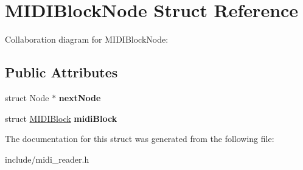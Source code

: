 \hypertarget{structMIDIBlockNode}{\section{M\-I\-D\-I\-Block\-Node Struct Reference}
\label{structMIDIBlockNode}
}


Collaboration diagram for M\-I\-D\-I\-Block\-Node\-:
\subsection*{Public Attributes}
\begin{DoxyCompactItemize}
\item 
\hypertarget{structMIDIBlockNode_a3a25e698bcdc86fe868e18d5fd808bc1}{struct Node $\ast$ {\bfseries next\-Node}}\label{structMIDIBlockNode_a3a25e698bcdc86fe868e18d5fd808bc1}

\item 
\hypertarget{structMIDIBlockNode_a7bf23ac93c2419cfd492537ffd8d2d03}{struct \hyperlink{structMIDIBlock}{M\-I\-D\-I\-Block} {\bfseries midi\-Block}}\label{structMIDIBlockNode_a7bf23ac93c2419cfd492537ffd8d2d03}

\end{DoxyCompactItemize}


The documentation for this struct was generated from the following file\-:\begin{DoxyCompactItemize}
\item 
include/midi\-\_\-reader.\-h\end{DoxyCompactItemize}
